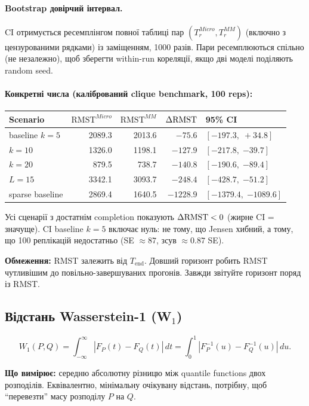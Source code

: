 \documentclass[11pt,a4paper]{article}
\begin{document}
\paragraph{Bootstrap довірчий інтервал.}
CI отримується ресемплінгом повної таблиці пар $(T_r^{Micro}, T_r^{MM})$
(включно з цензурованими рядками) із заміщенням, 1000 разів.  Пари
ресемплюються спільно (не незалежно), щоб зберегти within-run кореляції, якщо
дві моделі поділяють random seed.

\paragraph{Конкретні числа (калібрований clique benchmark, 100 reps):}
\begin{center}
\begin{tabular}{lrrrl}
\toprule
Scenario & $\mathrm{RMST}^{Micro}$ & $\mathrm{RMST}^{MM}$ & $\Delta\mathrm{RMST}$ & 95\% CI \\
\midrule
baseline $k=5$  & 2089.3 & 2013.6 & $-75.6$  & $[-197.3,\; +34.8]$ \\
$k=10$          & 1326.0 & 1198.1 & $-127.9$ & $[-217.8,\; \mathbf{-39.7}]$ \\
$k=20$          & 879.5  & 738.7  & $-140.8$ & $[-190.6,\; \mathbf{-89.4}]$ \\
$L=15$          & 3342.1 & 3093.7 & $-248.4$ & $[-428.7,\; \mathbf{-51.2}]$ \\
sparse baseline & 2869.4 & 1640.5 & $-1228.9$& $[-1379.4,\; \mathbf{-1089.6}]$ \\
\bottomrule
\end{tabular}
\end{center}
Усі сценарії з достатнім completion показують $\Delta\mathrm{RMST} < 0$ (жирне CI = значуще).
CI baseline $k=5$ включає нуль: не тому, що Jensen хибний, а тому, що
100 реплікацій недостатньо (SE $\approx 87$, зсув $\approx 0.87$ SE).

\textbf{Обмеження:} RMST залежить від $T_{\mathrm{end}}$.  Довший горизонт
робить RMST чутливішим до повільно-завершуваних прогонів.  Завжди звітуйте
горизонт поряд із RMST.

\subsection{Відстань Wasserstein-1 (W\texorpdfstring{$_1$}{1})}

\[
  W_1(P, Q) = \int_{-\infty}^{\infty} |F_P(t) - F_Q(t)|\, dt
            = \int_0^1 |F_P^{-1}(u) - F_Q^{-1}(u)|\, du.
\]

\textbf{Що вимірює:} середню абсолютну різницю між quantile
functions двох розподілів.  Еквівалентно, мінімальну очікувану відстань,
потрібну, щоб ``перевезти'' масу розподілу $P$ на $Q$.
\end{document}
